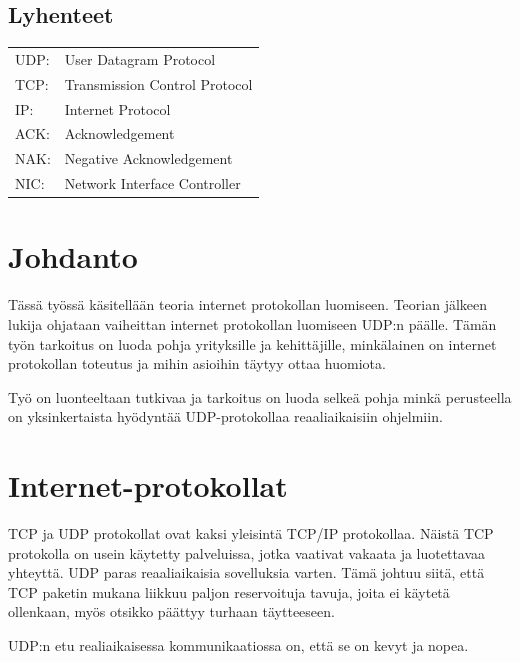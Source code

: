 \documentclass[a4paper,12pt]{article}
\begin{document}
\begin{titlepage}
        \tableofcontents
        \newpage
        \thispagestyle{empty}


        \section*{Lyhenteet}
        \begin{tabular}{l l}
            UDP: & User Datagram Protocol        \\
            TCP: & Transmission Control Protocol \\
            IP:  & Internet Protocol             \\
            ACK: & Acknowledgement               \\
            NAK: & Negative Acknowledgement      \\
            NIC: & Network Interface Controller  \\
        \end{tabular}
        \newpage


    \end{titlepage}


    \section{Johdanto}\label{sec:johdanto}
    Tässä työssä käsitellään teoria internet protokollan luomiseen. Teorian jälkeen lukija ohjataan vaiheittan internet protokollan luomiseen UDP:n päälle. Tämän työn tarkoitus on luoda pohja yrityksille ja kehittäjille, minkälainen on internet protokollan toteutus ja mihin asioihin täytyy ottaa huomiota.
    \par Työ on luonteeltaan tutkivaa ja tarkoitus on luoda selkeä pohja minkä perusteella on yksinkertaista hyödyntää UDP-protokollaa reaaliaikaisiin ohjelmiin.


    \section{Internet-protokollat}
    TCP ja UDP protokollat ovat kaksi yleisintä TCP/IP protokollaa.
    Näistä TCP protokolla on usein käytetty palveluissa, jotka vaativat vakaata ja luotettavaa yhteyttä. UDP paras reaaliaikaisia sovelluksia varten. Tämä johtuu siitä, että TCP paketin mukana liikkuu paljon reservoituja tavuja, joita ei käytetä ollenkaan, myös otsikko päättyy turhaan täytteeseen.
    \par
    UDP:n etu realiaikaisessa kommunikaatiossa on, että se on kevyt ja nopea. 
    \cite{KumarSurveyUDP}
    \par
    
\end{document}
